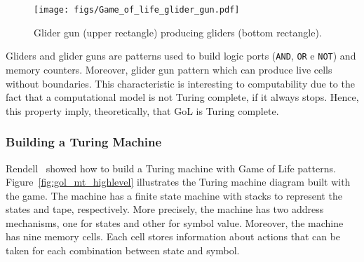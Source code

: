 \documentclass[12pt]{article}
\begin{document}

\begin{figure}[h]
    \centering
    \texttt{[image: figs/Game\_of\_life\_glider\_gun.pdf]}
    \caption{Glider gun (upper rectangle) producing gliders (bottom rectangle).}
    \label{fig:glider_gun}
\end{figure}

Gliders and glider guns are patterns used to build logic ports (\texttt{AND}, \texttt{OR} e \texttt{NOT}) and memory counters. Moreover, glider gun pattern which can produce live cells without boundaries. This characteristic is interesting to computability due to the fact that a computational model is not Turing complete, if it always stops. Hence, this property imply, theoretically, that GoL is Turing complete.


\subsubsection{Building a Turing Machine}

Rendell~\cite{Rendell:inproc:2011:jul, Rendell:phd:2014:jan} showed how to build a Turing machine with Game of Life patterns. Figure~\ref{fig:gol_mt_highlevel} illustrates the Turing machine diagram built with the game. The machine has a finite state machine with stacks to represent the states and tape, respectively. More precisely, the machine has two address mechanisms, one for states and other for symbol value. Moreover, the machine has nine memory cells. Each cell stores information about actions that can be taken for each combination between state and symbol.
\end{document}
